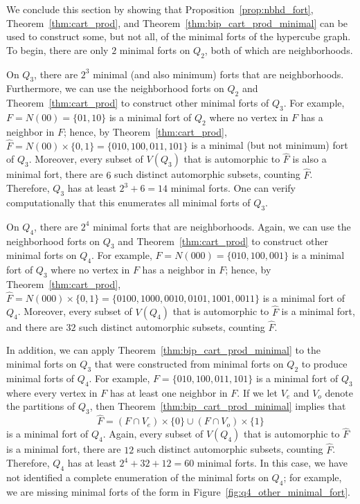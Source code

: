 \documentclass[twoside, 12pt]{article}
\theoremstyle{definition}
\begin{document}
We conclude this section by showing that Proposition~\ref{prop:nbhd_fort}, Theorem~\ref{thm:cart_prod}, and Theorem~\ref{thm:bip_cart_prod_minimal} can be used to construct some, but not all, of the minimal forts of the hypercube graph. 
To begin, there are only $2$ minimal forts on $Q_{2}$, both of which are neighborhoods. 

On $Q_{3}$, there are $2^{3}$ minimal (and also minimum) forts that are neighborhoods. 
Furthermore, we can use the neighborhood forts on $Q_{2}$ and Theorem~\ref{thm:cart_prod} to construct other minimal forts of $Q_{3}$. 
For example, $F=N(00)=\{01,10\}$ is a minimal fort of $Q_{2}$ where no vertex in $F$ has a neighbor in $F$; hence, by Theorem~\ref{thm:cart_prod}, $\hat{F}=N(00)\times\{0,1\}=\{010,100,011,101\}$ is a minimal (but not minimum) fort of $Q_{3}$. 
Moreover, every subset of $V(Q_{3})$ that is automorphic to $\hat{F}$ is also a minimal fort, there are $6$ such distinct automorphic subsets, counting $\hat{F}$. 
Therefore, $Q_{3}$ has at least $2^{3}+6=14$ minimal forts.
One can verify computationally that this enumerates all minimal forts of $Q_{3}$. 

On $Q_{4}$, there are $2^{4}$ minimal forts that are neighborhoods. 
Again, we can use the neighborhood forts on $Q_{3}$ and Theorem~\ref{thm:cart_prod} to construct other minimal forts on $Q_{4}$.
For example, $F=N(000)=\{010,100,001\}$ is a minimal fort of $Q_{3}$ where no vertex in $F$ has a neighbor in $F$; hence, by Theorem~\ref{thm:cart_prod}, $\hat{F}=N(000)\times\{0,1\}=\{0100,1000,0010,0101,1001,0011\}$ is a minimal fort of $Q_{4}$.
Moreover, every subset of $V(Q_{4})$ that is automorphic to $\hat{F}$ is a minimal fort, and there are $32$ such distinct automorphic subsets, counting $\hat{F}$.

In addition, we can apply Theorem~\ref{thm:bip_cart_prod_minimal} to the minimal forts on $Q_{3}$ that were constructed from minimal forts on $Q_{2}$ to produce minimal forts of $Q_{4}$.
For example, $F=\{010,100,011,101\}$ is a minimal fort of $Q_{3}$ where every vertex in $F$ has at least one neighbor in $F$.
If we let $V_{e}$ and $V_{o}$ denote the partitions of $Q_{3}$, then Theorem~\ref{thm:bip_cart_prod_minimal} implies that 
\[
\hat{F} = \left(F\cap V_{e}\right)\times\{0\}\cup\left(F\cap V_{o}\right)\times\{1\}
\]
is a minimal fort of $Q_{4}$.
Again, every subset of $V(Q_{4})$ that is automorphic to $\hat{F}$ is a minimal fort, there are $12$ such distinct automorphic subsets, counting $\hat{F}$. 
Therefore, $Q_{4}$ has at least $2^{4}+32+12=60$ minimal forts. 
In this case, we have not identified a complete enumeration of the minimal forts on $Q_{4}$; for example, we are missing minimal forts of the form in Figure~\ref{fig:q4_other_minimal_fort}. 
\end{document}
